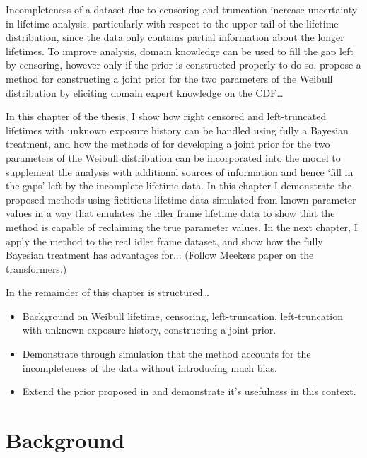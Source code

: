 Incompleteness of a dataset due to censoring and truncation increase uncertainty in lifetime analysis, particularly with respect to the upper tail of the lifetime distribution, since the data only contains partial information about the longer lifetimes. To improve analysis, domain knowledge can be used to fill the gap left by censoring, however only if the prior is constructed properly to do so. \citet{kaminskiy2005} propose a method for constructing a joint prior for the two parameters of the Weibull distribution by eliciting domain expert knowledge on the CDF\ldots

In this chapter of the thesis, I show how right censored and left-truncated lifetimes with unknown exposure history can be handled using fully a Bayesian treatment, and how the methods of \citet{kaminskiy2005} for developing a joint prior for the two parameters of the Weibull distribution can be incorporated into the model to supplement the analysis with additional sources of information and hence `fill in the gaps' left by the incomplete lifetime data. In this chapter I demonstrate the proposed methods using fictitious lifetime data simulated from known parameter values in a way that emulates the idler frame lifetime data to show that the method is capable of reclaiming the true parameter values. In the next chapter, I apply the method to the real idler frame dataset, and show how the fully Bayesian treatment has advantages for... (Follow Meekers paper on the transformers.)

In the remainder of this chapter is structured\ldots
\begin{itemize}
    \item Background on Weibull lifetime, censoring, left-truncation, left-truncation with unknown exposure history, constructing a joint prior.
    \item Demonstrate through simulation that the method accounts for the incompleteness of the data without introducing much bias.
    \item Extend the prior proposed in \citet{kaminskiy2005} and demonstrate it's usefulness in this context.
\end{itemize}


\section{Background}

